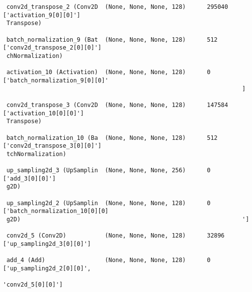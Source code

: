 \documentclass[
  letterpaper,
  DIV=11,
  numbers=noendperiod]{scrreprt}
\begin{document}
\begin{verbatim}
 conv2d_transpose_2 (Conv2D  (None, None, None, 128)      295040    ['activation_9[0][0]']        
 Transpose)                                                                                       
                                                                                                  
 batch_normalization_9 (Bat  (None, None, None, 128)      512       ['conv2d_transpose_2[0][0]']  
 chNormalization)                                                                                 
                                                                                                  
 activation_10 (Activation)  (None, None, None, 128)      0         ['batch_normalization_9[0][0]'
                                                                    ]                             
                                                                                                  
 conv2d_transpose_3 (Conv2D  (None, None, None, 128)      147584    ['activation_10[0][0]']       
 Transpose)                                                                                       
                                                                                                  
 batch_normalization_10 (Ba  (None, None, None, 128)      512       ['conv2d_transpose_3[0][0]']  
 tchNormalization)                                                                                
                                                                                                  
 up_sampling2d_3 (UpSamplin  (None, None, None, 256)      0         ['add_3[0][0]']               
 g2D)                                                                                             
                                                                                                  
 up_sampling2d_2 (UpSamplin  (None, None, None, 128)      0         ['batch_normalization_10[0][0]
 g2D)                                                               ']                            
                                                                                                  
 conv2d_5 (Conv2D)           (None, None, None, 128)      32896     ['up_sampling2d_3[0][0]']     
                                                                                                  
 add_4 (Add)                 (None, None, None, 128)      0         ['up_sampling2d_2[0][0]',     
                                                                     'conv2d_5[0][0]']            
                                                                                                  

\end{verbatim}
\end{document}
